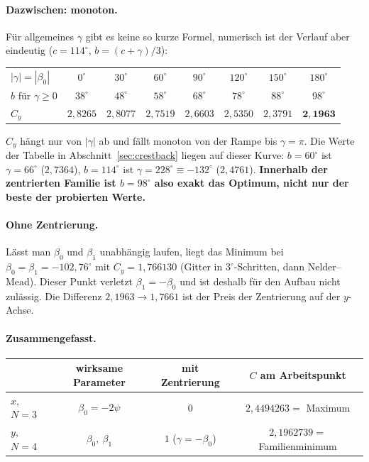 \documentclass[11pt,a4paper]{article}
\newcommand{\crest}{\ensuremath{C}}
\begin{document}
\paragraph{Dazwischen: monoton.}
Für allgemeines $\gamma$ gibt es keine so kurze Formel, numerisch ist der
Verlauf aber eindeutig ($c=114^\circ$, $b = (c+\gamma)/3$):
\begin{center}
\begin{tabular}{@{}lccccccc@{}}
  \toprule
  $|\gamma| = |\beta_0|$ & $0^\circ$ & $30^\circ$ & $60^\circ$ & $90^\circ$ & $120^\circ$ & $150^\circ$ & $180^\circ$\\
  $b$ für $\gamma\ge0$ & $38^\circ$ & $48^\circ$ & $58^\circ$ & $68^\circ$ & $78^\circ$ & $88^\circ$ & $98^\circ$\\
  \midrule
  $\crest_y$ & $2{,}8265$ & $2{,}8077$ & $2{,}7519$ & $2{,}6603$ & $2{,}5350$ & $2{,}3791$ & $\mathbf{2{,}1963}$\\
  \bottomrule
\end{tabular}
\end{center}
$\crest_y$ hängt nur von $|\gamma|$ ab und fällt monoton von der Rampe bis
$\gamma=\pi$. Die Werte der Tabelle in Abschnitt~\ref{sec:crestback} liegen
auf dieser Kurve: $b=60^\circ$ ist $\gamma=66^\circ$ ($2{,}7364$),
$b=114^\circ$ ist $\gamma=228^\circ\equiv-132^\circ$ ($2{,}4761$).
\textbf{Innerhalb der zentrierten Familie ist $b=98^\circ$ also exakt das
Optimum, nicht nur der beste der probierten Werte.}

\paragraph{Ohne Zentrierung.}
Lässt man $\beta_0$ und $\beta_1$ unabhängig laufen, liegt das Minimum bei
$\beta_0=\beta_1=-102{,}76^\circ$ mit $\crest_y = 1{,}766130$ (Gitter in
$3^\circ$-Schritten, dann Nelder--Mead). Dieser Punkt verletzt
$\beta_1=-\beta_0$ und ist deshalb für den Aufbau nicht zulässig. Die
Differenz $2{,}1963 \to 1{,}7661$ ist der Preis der Zentrierung auf der
$y$-Achse.

\paragraph{Zusammengefasst.}
\begin{center}
\begin{tabular}{@{}lccc@{}}
  \toprule
  & wirksame Parameter & mit Zentrierung & $\crest$ am Arbeitspunkt\\
  \midrule
  $x$, $N=3$ & $\beta_0=-2\psi$ & $0$ & $2{,}4494263 = $ Maximum\\
  $y$, $N=4$ & $\beta_0,\ \beta_1$ & $1$ ($\gamma=-\beta_0$) & $2{,}1962739 = $ Familienminimum\\
  \bottomrule
\end{tabular}
\end{center}
\end{document}
